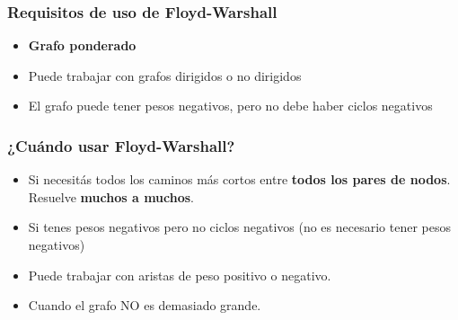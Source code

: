 \documentclass[10pt,a4paper]{article}
\begin{document}
\subsubsection*{Requisitos de uso de Floyd-Warshall}
\begin{itemize}
    \item \textbf{Grafo ponderado}
    \item Puede trabajar con grafos dirigidos o no dirigidos 
    \item El grafo puede tener pesos negativos, pero no debe haber ciclos negativos
\end{itemize}
\subsubsection*{¿Cuándo usar Floyd-Warshall?}
\begin{itemize}
    \item Si necesitás todos los caminos más cortos entre \textbf{todos los pares de nodos}. Resuelve \textbf{muchos a muchos}.
    \item Si tenes pesos negativos pero no ciclos negativos (no es necesario tener pesos negativos)
    \item Puede trabajar con aristas de peso positivo o negativo.
    \item Cuando el grafo NO es demasiado grande.
\end{itemize}
\end{document}
